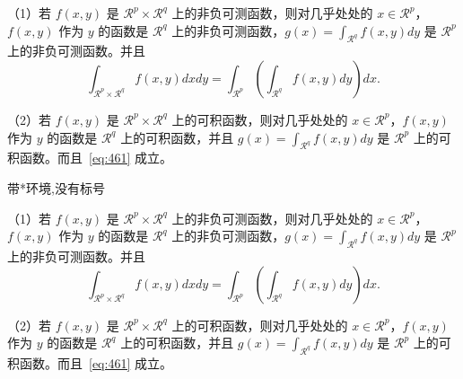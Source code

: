 \begin{theorem}[Fubini 定理] \label{thm:fubi} 
（1）若 $f(x,y)$ 是 $\mathcal{R}^p\times\mathcal{R}^q$ 上的非负可测函数，则对几乎处处的 $x\in \mathcal{R}^p$，$f(x,y)$ 作为 $y$ 的函数是 $\mathcal{R}^q$ 上的非负可测函数，$g(x)=\int_{\mathcal{R}^q}f(x,y) dy$ 是 $\mathcal{R}^p$ 上的非负可测函数。并且
\begin{equation}
\label{eq:461}
\int_{\mathcal{R}^p\times\mathcal{R}^q} f(x,y) dxdy=\int_{\mathcal{R}^p}\left(\int_{\mathcal{R}^q}f(x,y)dy\right)dx.
\end{equation}

（2）若 $f(x,y)$ 是 $\mathcal{R}^p\times\mathcal{R}^q$ 上的可积函数，则对几乎处处的 $x\in\mathcal{R}^p$，$f(x,y)$ 作为 $y$ 的函数是 $\mathcal{R}^q$ 上的可积函数，并且 $g(x)=\int_{\mathcal{R}^q}f(x,y) dy$ 是 $\mathcal{R}^p$ 上的可积函数。而且~\ref{eq:461} 成立。
\end{theorem}

带*环境,没有标号
\begin{theorem*}[Fubini 定理] \label{thm:fubi} 
（1）若 $f(x,y)$ 是 $\mathcal{R}^p\times\mathcal{R}^q$ 上的非负可测函数，则对几乎处处的 $x\in \mathcal{R}^p$，$f(x,y)$ 作为 $y$ 的函数是 $\mathcal{R}^q$ 上的非负可测函数，$g(x)=\int_{\mathcal{R}^q}f(x,y) dy$ 是 $\mathcal{R}^p$ 上的非负可测函数。并且
\begin{equation}
\label{eq:461}
\int_{\mathcal{R}^p\times\mathcal{R}^q} f(x,y) dxdy=\int_{\mathcal{R}^p}\left(\int_{\mathcal{R}^q}f(x,y)dy\right)dx.
\end{equation}

（2）若 $f(x,y)$ 是 $\mathcal{R}^p\times\mathcal{R}^q$ 上的可积函数，则对几乎处处的 $x\in\mathcal{R}^p$，$f(x,y)$ 作为 $y$ 的函数是 $\mathcal{R}^q$ 上的可积函数，并且 $g(x)=\int_{\mathcal{R}^q}f(x,y) dy$ 是 $\mathcal{R}^p$ 上的可积函数。而且~\ref{eq:461} 成立。
\end{theorem*}




%
